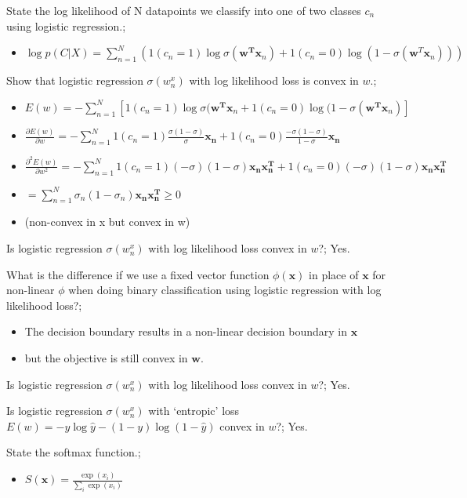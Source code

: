 \documentclass{article}
\begin{document}
State the log likelihood of N datapoints we classify into one of two classes $c_n$ using logistic regression.; \begin{itemize} \item $\log p(C|X) = \sum_{n=1}^N (1(c_n = 1)\log \sigma(\bm{w^Tx}_n) + 1(c_n = 0)\log (1-\sigma(\bm{w}^T\bm{x}_n)))$ \end{itemize}

Show that logistic regression $\sigma(w^x_n)$ with log likelihood loss is convex in $w$.; \begin{itemize} \item $E(w)=-\sum_{n=1}^N [1(c_n=1)\log \sigma(\mathbf{w^Tx}_n + 1(c_n=0)\log(1-\sigma(\mathbf{w^Tx}_n)]$ \item $\frac{\partial E(w)}{\partial w} = -\sum_{n=1}^N 1(c_n=1)\frac{\sigma(1-\sigma)}{\sigma}\mathbf{x_n} + 1(c_n=0)\frac{-\sigma(1-\sigma)}{1-\sigma}\mathbf{x_n}$ \item $\frac{\partial^2E(w)}{\partial w^2} = -\sum_{n=1}^N 1(c_n = 1)(-\sigma)(1-\sigma)\mathbf{x_nx_n^T}+1(c_n=0)(-\sigma)(1-\sigma)\mathbf{x_nx_n^T}$ \item $=\sum_{n=1}^N \sigma_n(1-\sigma_n)\mathbf{x_nx_n^T}\geq 0$ \item (non-convex in x but convex in w) \end{itemize}

Is logistic regression $\sigma(w^x_n)$ with log likelihood loss convex in $w$?; Yes.

What is the difference if we use a fixed vector function $\phi(\bm{x})$ in place of $\bm{x}$ for non-linear $\phi$ when doing binary classification using logistic regression with log likelihood loss?; \begin{itemize} \item The decision boundary results in a non-linear decision boundary in $\bm{x}$ \item but the objective is still convex in $\bm{w}$. \end{itemize}

Is logistic regression $\sigma(w^x_n)$ with log likelihood loss convex in $w$?; Yes.

Is logistic regression $\sigma(w^x_n)$ with `entropic' loss $E(w) = -y\log\hat{y} - (1-y)\log(1-\hat{y})$ convex in $w$?; Yes.

State the softmax function.; \begin{itemize} \item $S(\bm{x}) = \frac{\exp(x_i)}{\sum_i \exp(x_i)}$ \end{itemize}
\end{document}

